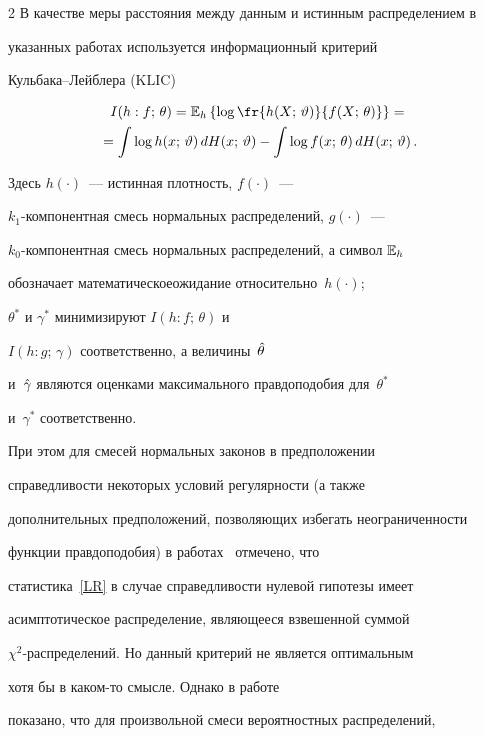 \begin{multicols}{2}
В качестве меры расстояния между данным и истинным распределением в

указанных работах используется информационный критерий

Куль\-ба\-ка--Лейб\-ле\-ра (KLIC)

\begin{multline*}

I(h:f;\,\theta)=\E_h\left\{\log\fr{h(X;\,\vartheta)}{f(X;\,\theta)}\right\}={}\\

\!{}=\int\log h(x;\,\vartheta)\,dH(x;\,\vartheta)-\int\log f(x;\,\theta)\,dH(x;\,\vartheta)\,.

\end{multline*}

Здесь $h(\cdot)$~--- истинная плотность, $f(\cdot)$~---

$k_1$-ком\-по\-нент\-ная смесь нормальных распределений, $g(\cdot)$~---

$k_0$-ком\-по\-нент\-ная смесь нормальных распределений, а символ $\mathbb E_h$

обозначает математическое\linebreak ожидание относительно~$h(\cdot)$;

$\theta^*$ и $\gamma^*$ минимизируют $I(h:f;\,\theta)$ и

$I(h:g;\,\gamma)$ соответственно, а величины~$\Hat\theta$ 

и~$\Hat\gamma$ являются оценками максимального правдоподобия для~$\theta^*$ 

и~$\gamma^*$ соответственно.



При этом для смесей нормальных законов в предположении

справедливости некоторых условий регулярности (а также

дополнительных предположений, позволяющих избегать неограниченности

функции правдоподобия) в работах~\cite{Lo2001, Lo2005} отмечено, что

статистика~\eqref{LR} в случае спра\-вед\-ли\-вости нулевой гипотезы имеет

асимптотическое распределение, являющееся взвешенной суммой

$\chi^2$-рас\-пре\-де\-ле\-ний. Но данный критерий не является оптимальным

хотя бы в каком-то смысле. Однако в работе~\cite{Vuong1989}

показано, что для произвольной смеси вероятностных распределений,


\end{multicols}
